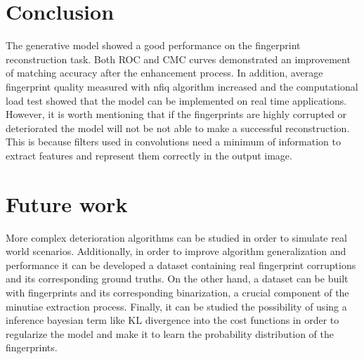 \documentclass[a4paper,fleqn]{cas-dc}
\begin{document}
\section{Conclusion}
\label{sec:CON}

The generative model showed a good performance on the fingerprint reconstruction task. Both ROC and CMC curves demonstrated an improvement of matching accuracy after the enhancement process. In addition, average fingerprint quality measured with nfiq algorithm increased and the computational load test showed that the model can be implemented on real time applications. However, it is worth mentioning that if the fingerprints are highly corrupted or deteriorated the model will not be not able to make a successful reconstruction. This is because filters used in convolutions need a minimum of information to extract features and represent them correctly in the output image.

\section{Future work}
\label{sec:FW}

More complex deterioration algorithms can be studied in order to simulate real world scenarios. Additionally, in order to improve algorithm generalization and performance it can be developed a dataset containing real fingerprint corruptions and its corresponding ground truths. On the other hand, a dataset can be built with fingerprints and its corresponding binarization, a crucial component of the minutiae extraction process. Finally, it can be studied the possibility of using a inference bayesian term like KL divergence into the cost functions in order to regularize the model and make it to learn the probability distribution of the fingerprints.

\printcredits

%





\end{document}
